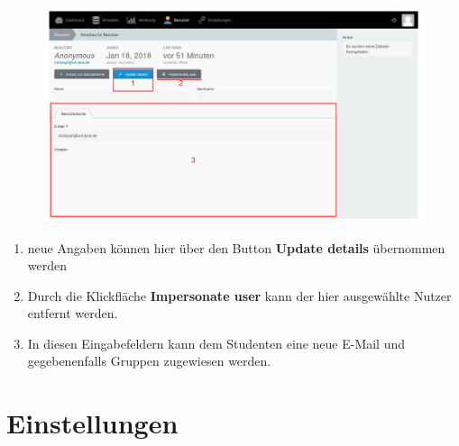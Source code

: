  
  \begin{figure}
  	\centering
  	\includegraphics[scale=0.5]{backend/img/users_3.pdf}
  \end{figure}
  \begin{enumerate}
   \item neue Angaben können hier über den Button \textbf{Update details} übernommen werden
   \item Durch die Klickfläche \textbf{Impersonate user} kann der hier ausgewählte Nutzer entfernt werden.
   \item In diesen Eingabefeldern kann dem Studenten eine neue E-Mail und gegebenenfalls Gruppen zugewiesen werden.
  \end{enumerate}

  
  
  \section{Einstellungen}
  \label{section:settings}
  

